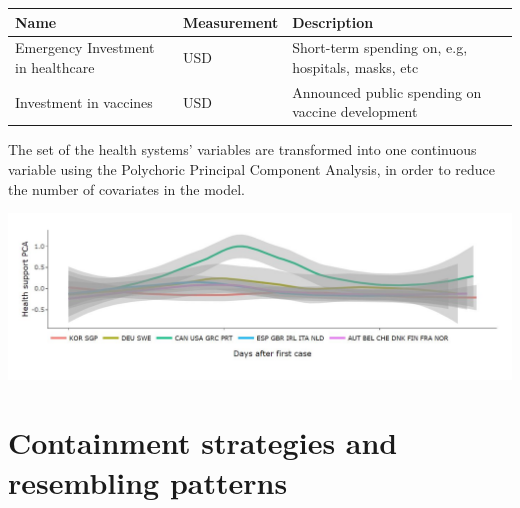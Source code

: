 \documentclass[
  6pt,
]{article}
\begin{document}
\begin{longtable}[]{@{}lll@{}}
\toprule
\begin{minipage}[b]{0.30\columnwidth}\raggedright
\textbf{Name}\strut
\end{minipage} & \begin{minipage}[b]{0.2\columnwidth}\raggedright
\textbf{Measurement} \strut
\end{minipage} & \begin{minipage}[b]{0.4\columnwidth}\raggedright
\textbf{Description}\strut
\end{minipage}\tabularnewline
\midrule
\endhead
\begin{minipage}[t]{0.4\columnwidth}\raggedright
Emergency Investment in healthcare\strut
\end{minipage} & \begin{minipage}[t]{0.11\columnwidth}\raggedright
USD\strut
\end{minipage} & \begin{minipage}[t]{0.47\columnwidth}\raggedright
Short-term spending on, e.g, hospitals, masks, etc\strut
\end{minipage}\tabularnewline
\begin{minipage}[t]{0.33\columnwidth}\raggedright
Investment in vaccines\strut
\end{minipage} & \begin{minipage}[t]{0.11\columnwidth}\raggedright
USD\strut
\end{minipage} & \begin{minipage}[t]{0.47\columnwidth}\raggedright
Announced public spending on vaccine development\strut
\end{minipage}\tabularnewline
\bottomrule
\end{longtable}

The set of the health systems' variables are transformed into one
continuous variable using the Polychoric Principal Component Analysis,
in order to reduce the number of covariates in the model.
\begin{center}
\includegraphics[width=\textwidth]{Report_SC_Group3_files/figure-latex/fig4.jpg}
\end{center}
\hypertarget{containment-strategies-and-resembling-patterns}{%
\section{Containment strategies and resembling
patterns}\label{containment-strategies-and-resembling-patterns}}
\end{document}
